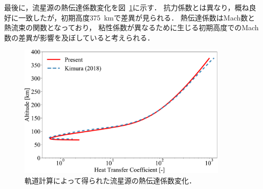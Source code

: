 最後に，流星源の熱伝達係数変化を図~\ref{fig:trajectory-Ch}に示す．
抗力係数とは異なり，概ね良好に一致したが，初期高度375~kmで差異が見られる．
熱伝達係数はMach数と熱流束の関数となっており，
粘性係数が異なるために生じる初期高度でのMach数の差異が影響を及ぼしていると考えられる．
\begin{figure}[p]
    \centering
    \includegraphics[width=10cm]{fig/trajectory/Ch.pdf}
    \caption{軌道計算によって得られた流星源の熱伝達係数変化．}
    \label{fig:trajectory-Ch}
\end{figure}

%
%
